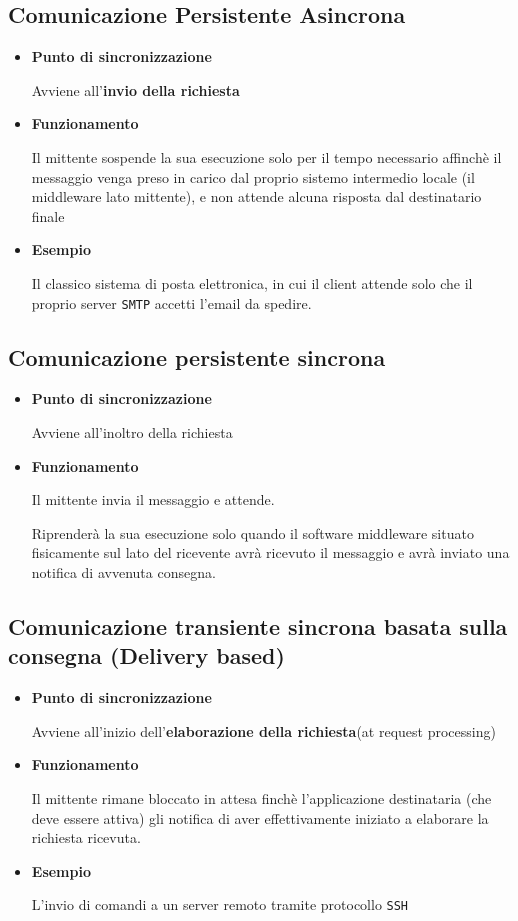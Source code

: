 \subsection{Comunicazione Persistente Asincrona}
\begin{itemize}
    \item \textbf{Punto di sincronizzazione}

    Avviene all'\textbf{invio della richiesta}

    \item \textbf{Funzionamento}

    Il mittente sospende la sua esecuzione solo per il tempo necessario affinchè il messaggio venga preso in carico dal proprio sistemo intermedio locale (il middleware lato mittente), e non attende alcuna risposta dal destinatario finale

    \item \textbf{Esempio}

    Il classico sistema di posta elettronica, in cui il client attende solo che il proprio server \texttt{SMTP} accetti l'email da spedire.
\end{itemize}

\subsection{Comunicazione persistente sincrona}
\begin{itemize}
    \item \textbf{Punto di sincronizzazione}

    Avviene all'inoltro della richiesta

    \item \textbf{Funzionamento}

    Il mittente invia il messaggio e attende.

    Riprenderà la sua esecuzione solo quando il software middleware situato fisicamente sul lato del ricevente avrà ricevuto il messaggio e avrà inviato una notifica di avvenuta consegna.
\end{itemize}

\subsection{Comunicazione transiente sincrona basata sulla consegna (Delivery based)}
\begin{itemize}
    \item \textbf{Punto di sincronizzazione}

    Avviene all'inizio dell'\textbf{elaborazione della richiesta}(at request processing)

    \item \textbf{Funzionamento}

    Il mittente rimane bloccato in attesa finchè l'applicazione destinataria (che deve essere attiva) gli notifica di aver effettivamente iniziato a elaborare la richiesta ricevuta.

    \item \textbf{Esempio}

    L'invio di comandi a un server remoto tramite protocollo \texttt{SSH}
\end{itemize}

